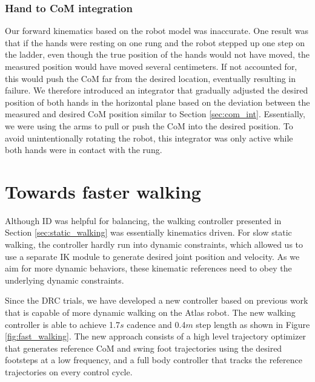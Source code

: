 \documentclass{ws-ijhr}
\newcommand{\fref}[1] {Figure \ref{#1}}
\newcommand{\sref}[1] {Section \ref{#1}}
\begin{document}
\subsubsection{Hand to CoM integration}
Our forward kinematics based on the robot model was inaccurate. 
One result was that if the hands were resting on one rung and the robot stepped
up one step on the ladder, even though the true position of the hands would not
have moved, the measured position would have moved several centimeters. 
If not accounted for, this would push the CoM far from the desired location, 
eventually resulting in failure. 
We therefore introduced an integrator that gradually adjusted the desired position
of both hands in the horizontal plane based on the deviation between the measured 
and desired CoM position similar to \sref{sec:com_int}. 
Essentially, we were using the arms to pull or push the CoM into the desired 
position. 
To avoid unintentionally rotating the robot, this integrator was only active 
while both hands were in contact with the rung. 

\section{Towards faster walking}
\label{sec:new_stuff}
Although ID was helpful for balancing, the walking controller presented in 
\sref{sec:static_walking} was essentially kinematics driven. 
For slow static walking, the controller hardly run into dynamic constraints, 
which allowed us to use a separate IK module to generate desired joint 
position and velocity. 
As we aim for more dynamic behaviors, these kinematic references need to obey
the underlying dynamic constraints. 

Since the DRC trials, we have developed a new controller based on previous 
work that is capable of more dynamic walking on the Atlas robot. 
The new walking controller is able to achieve 1.7$s$ cadence and 0.4$m$
step length as shown in \fref{fig:fast_walking}. 
The new approach consists of a high level trajectory optimizer that generates
reference CoM and swing foot trajectories using the desired footsteps at a low
frequency, and a full body controller that tracks the reference trajectories 
on every control cycle. 
\end{document}
